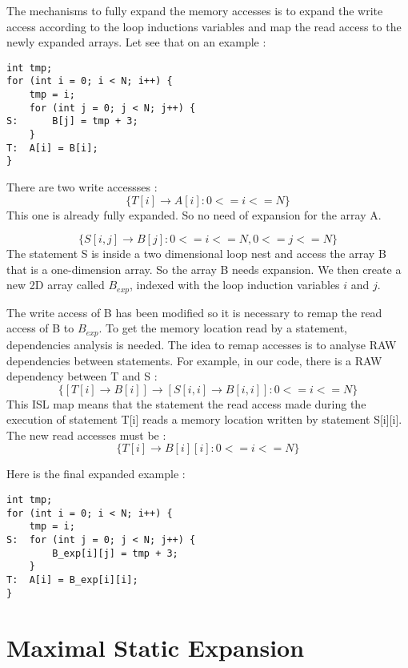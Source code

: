 The mechanisms to fully expand the memory accesses is to expand the write access according to the loop inductions variables and map the read access to the newly expanded arrays. Let see that on an example :

\begin{lstlisting}[frame=single]
int tmp;
for (int i = 0; i < N; i++) {
    tmp = i;
    for (int j = 0; j < N; j++) {
S:      B[j] = tmp + 3;
    }
T:  A[i] = B[i];
}
\end{lstlisting}

There are two write accessses :
\[
\{T[i] \rightarrow A[i]:0<=i<=N\}
\]
This one is already fully expanded. So no need of expansion for the array A.

\[
\{S[i,j] \rightarrow B[j]:0<=i<=N,0<=j<=N\}
\]
The statement S is inside a two dimensional loop nest and access the array B that is a one-dimension array. So the array B needs expansion. We then create a new 2D array called $B_{exp}$, indexed with the loop induction variables $i$ and $j$.

The write access of B has been modified so it is necessary to remap the read access of B to $B_{exp}$. To get the memory location read by a statement, dependencies analysis is needed. The idea to remap accesses is to analyse RAW dependencies between statements. For example, in our code, there is a RAW dependency between T and S :
\[
\{[T[i] \rightarrow B[i]] \rightarrow [S[i,i] \rightarrow B[i,i]]:0<=i<=N\}
\]
This ISL map means that the statement the read access made during the execution of statement T[i] reads a memory location written by statement S[i][i]. The new read accesses must be :
 \[
\{T[i] \rightarrow B[i][i]:0<=i<=N\}
\]

Here is the final expanded example :
\begin{lstlisting}[frame=single]
int tmp;
for (int i = 0; i < N; i++) {
    tmp = i;
S:  for (int j = 0; j < N; j++) {
        B_exp[i][j] = tmp + 3;
    }
T:  A[i] = B_exp[i][i];
}
\end{lstlisting}


\section{Maximal Static Expansion}
